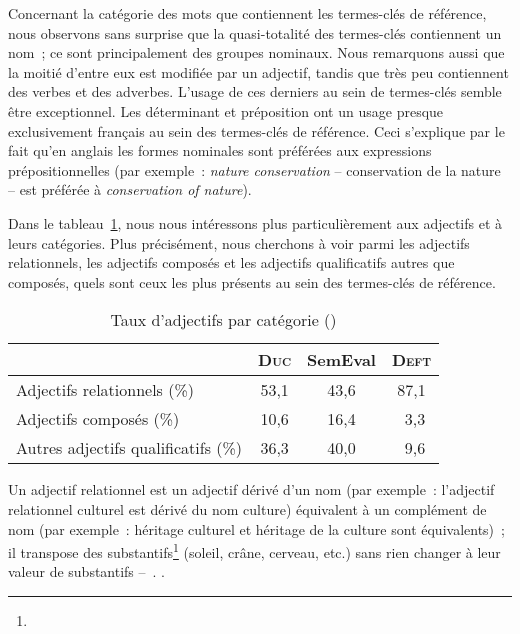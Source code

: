      Concernant la catégorie des mots que contiennent les termes-clés de
      référence, nous observons sans surprise que la quasi-totalité des
      termes-clés contiennent un nom~; ce sont principalement des groupes
      nominaux. Nous remarquons aussi que la moitié d'entre eux est modifiée par
      un adjectif, tandis que très peu contiennent des verbes et des adverbes.
      L'usage de ces derniers au sein de termes-clés semble être exceptionnel.
      Les déterminant et préposition ont un usage presque exclusivement français
      au sein des termes-clés de référence. Ceci s'explique par le fait qu'en
      anglais les formes nominales sont préférées aux expressions
      prépositionnelles (par exemple~: \textit{\og{}nature conservation\fg{}} --
      \og{}conservation de la nature\fg{} -- est préférée à
      \textit{\og{}conservation of nature\fg{}}).

      Dans le tableau~\ref{tab:candidate_selection-adjective_categories}, nous
      nous intéressons plus particulièrement aux adjectifs et à leurs
      catégories. Plus précisément, nous cherchons à voir parmi les adjectifs
      relationnels, les adjectifs composés et les adjectifs qualificatifs autres
      que composés, quels sont ceux les plus présents au sein des termes-clés de
      référence.
      \begin{table}[!ht]
        \centering
          \begin{tabular}{l|ccc}
            \toprule
            & \textbf{\textsc{Duc}} & \textbf{SemEval} & \textbf{\textsc{Deft}} \\
            \hline
            Adjectifs relationnels \hfill(\%) & 53,1 & 43,6 & 87,1\\
            Adjectifs composés \hfill(\%) & 10,6 & 16,4 & $~~$3,3\\
            Autres adjectifs qualificatifs \hfill(\%) & 36,3 & 40,0 & $~~$9,6\\
            \bottomrule
        \end{tabular}
        \caption{Taux d'adjectifs par catégorie ()}
        \label{tab:candidate_selection-adjective_categories}
      \end{table}
      
      Un adjectif relationnel est un adjectif dérivé d'un nom (par exemple~:
      l'adjectif relationnel \og{}culturel\fg{} est dérivé du nom
      \og{}culture\fg{}) équivalent à un complément de nom (par exemple~:
      \og{}héritage culturel\fg{} et \og{}héritage de la culture\fg{} sont
      équivalents)~; il \og{}transpose des
      substantifs\footnote{} (soleil, crâne, cerveau,
      etc.) sans rien changer à leur valeur de substantifs
      --~\cite{bally1944linguistiquegeneraleetlinguistiquefrancaise}\fg{}.
      .
      
